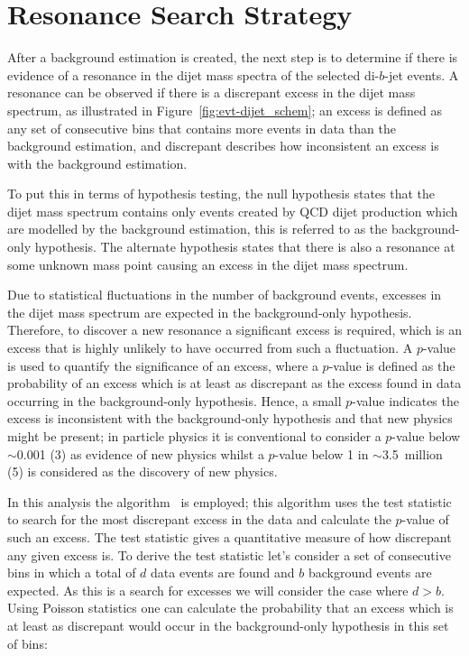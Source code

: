 \vfill
\section{Resonance Search Strategy}
\label{sec:bkg-bh}

After a background estimation is created, the next step is to determine
if there is evidence of a resonance in the dijet mass spectra of the selected di-$b$-jet events.
A resonance can be observed if there is a discrepant excess in the dijet mass spectrum, as illustrated in Figure~\ref{fig:evt-dijet_schem};
an excess is defined as any set of consecutive bins that contains
more events in data than the background estimation,
and discrepant describes how inconsistent an excess is with the background estimation.

To put this in terms of hypothesis testing,
the null hypothesis states that the dijet mass spectrum contains only events created by QCD dijet production
which are modelled by the background estimation,
this is referred to as the background-only hypothesis.
The alternate hypothesis states that there is also a resonance at some
unknown mass point causing an excess in the dijet mass spectrum.

Due to statistical fluctuations in the number of background events,
excesses in the dijet mass spectrum are expected in the background-only hypothesis.
Therefore, to discover a new resonance a significant excess is required,
which is an excess that is highly unlikely to have occurred from such a fluctuation.
A \mbox{$p$-value} is used to quantify the significance of an excess,
where a \mbox{$p$-value} is defined as the probability of an excess which is at least as discrepant as the excess found in data
occurring in the background-only hypothesis.
Hence, a small \mbox{$p$-value} indicates the excess is inconsistent with the background-only hypothesis and that new physics might be present;
in particle physics it is conventional to consider a \mbox{$p$-value} below $\sim$0.001 (3\sigma) as evidence of new physics
whilst a \mbox{$p$-value} below 1 in $\sim$3.5~million (5\sigma) is considered as the discovery of new physics.

In this analysis the \bh{} algorithm~\cite{dibjet-bh} is employed;
this algorithm uses the \bh{} test statistic to 
search for the most discrepant excess in the data
and calculate the \mbox{$p$-value} of such an excess.
The \bh{} test statistic gives a quantitative measure of how discrepant any given excess is.
To derive the test statistic let's consider a set of consecutive bins in which
a total of $d$ data events are found and $b$ background events are expected.
As this is a search for excesses we will consider the case where $d > b$.
Using Poisson statistics one can calculate the probability that an excess which is at least as discrepant
would occur in the background-only hypothesis in this set of bins:


